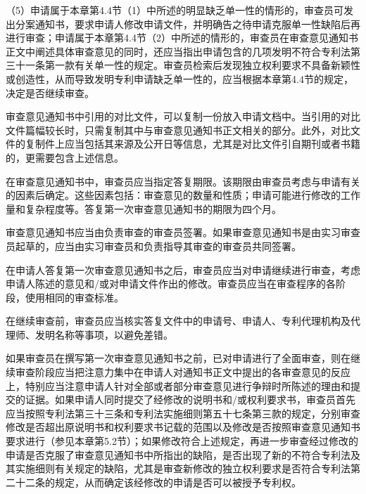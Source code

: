{\setlength{\parindent}{17.1bp}（5）申请属于本章第4.4节（1）中所述的明显缺乏单一性的情形的，审查员可发出分案通知书，要求申请人修改申请文件，并明确告之待申请克服单一性缺陷后再进行审查；申请属于本章第4.4节（2）中所述的情形的，审查员在审查意见通知书正文中阐述具体审查意见的同时，还应当指出申请包含的几项发明不符合专利法第三十一条第一款有关单一性的规定。审查员检索后发现独立权利要求不具备新颖性或创造性，从而导致发明专利申请缺乏单一性的，应当根据本章第4.4节的规定，决定是否继续审查。\par}

审查意见通知书中引用的对比文件，可以复制一份放入申请文档中。当引用的对比文件篇幅较长时，只需复制其中与审查意见通知书正文相关的部分。此外，对比文件的复制件上应当包括其来源及公开日等信息，尤其是对比文件引自期刊或者书籍的，更需要包含上述信息。

在审查意见通知书中，审查员应当指定答复期限。该期限由审查员考虑与申请有关的因素后确定。这些因素包括：审查意见的数量和性质；申请可能进行修改的工作量和复杂程度等。答复第一次审查意见通知书的期限为四个月。

审查意见通知书应当由负责审查的审查员签署。如果审查意见通知书是由实习审查员起草的，应当由实习审查员和负责指导其审查的审查员共同签署。

在申请人答复第一次审查意见通知书之后，审查员应当对申请继续进行审查，考虑申请人陈述的意见和/或对申请文件作出的修改。审查员应当在审查程序的各阶段，使用相同的审查标准。

在继续审查前，审查员应当核实答复文件中的申请号、申请人、专利代理机构及代理师、发明名称等事项，以避免差错。

如果审查员在撰写第一次审查意见通知书之前，已对申请进行了全面审查，则在继续审查阶段应当把注意力集中在申请人对通知书正文中提出的各审查意见的反应上，特别应当注意申请人针对全部或者部分审查意见进行争辩时所陈述的理由和提交的证据。如果申请人同时提交了经修改的说明书和/或权利要求书，审查员首先应当按照专利法第三十三条和专利法实施细则第五十七条第三款的规定，分别审查修改是否超出原说明书和权利要求书记载的范围以及修改是否按照审查意见通知书要求进行（参见本章第5.2节）；如果修改符合上述规定，再进一步审查经过修改的申请是否克服了审查意见通知书中所指出的缺陷，是否出现了新的不符合专利法及其实施细则有关规定的缺陷，尤其是审查新修改的独立权利要求是否符合专利法第二十二条的规定，从而确定该经修改的申请是否可以被授予专利权。

